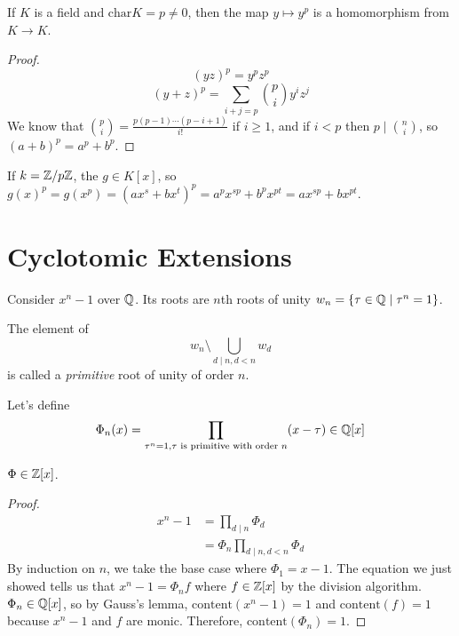 \documentclass[a4paper,twoside,master.tex]{subfiles}
\begin{document}
\begin{claim}
    If $ K $ is a field and $ \text{char} K = p \neq 0 $, then the map $ y \mapsto y^p $ is a homomorphism from $ K \to K $.
\end{claim}
\begin{proof}
    \begin{equation}
        (yz)^p = y^p z^p
    \end{equation}
    \begin{equation}
        (y+z)^p = \sum_{i+j=p} \binom{p}{i} y^i z^j
    \end{equation}
    We know that $ \binom{p}{i} = \frac{p(p-1)\cdots(p-i+1)}{i!} $ if $ i \geq 1 $, and if $ i<p $ then $ p\mid \binom{n}{i} $, so $ (a+b)^p = a^p + b^p $.
\end{proof}
\begin{corollary}
    If $ k = \mathbb{Z}/p\mathbb{Z} $, the $ g \in K[x] $, so $ g(x)^p = g(x^p) = (ax^s + bx^t)^p = a^p x^{sp} + b^p x^{pt} = ax^{sp} + bx^{pt} $.
\end{corollary}

\section{Cyclotomic Extensions}\label{sec:cyclotomic_extensions}

Consider $ x^n - 1 $ over $ \mathbb{Q} $. Its roots are $ n $th roots of unity $ w_n = \{\tau \in \mathbb{Q}\mid \tau^n = 1\} $.

\begin{definition}
    The element of
    \begin{equation}
        w_n \setminus \bigcup_{d\mid n, d<n} w_d 
    \end{equation}
    is called a \textit{primitive} root of unity of order $ n $.
\end{definition}

Let's define
\begin{equation}
    \Phi_n(x) = \prod_{\tau^n = 1, \tau \text{ is primitive with order } n} (x - \tau) \in \mathbb{Q}[x]
\end{equation}
\begin{claim}
    $ \Phi \in \mathbb{Z}[x] $.
\end{claim}
\begin{proof}
    \begin{align}
        x^n - 1 &= \prod_{d\mid n} \Phi_d\\
                &= \Phi_n \prod_{d\mid n, d<n} \Phi_d
    \end{align}
    By induction on $ n $, we take the base case where $ \Phi_1 = x-1 $. The equation we just showed tells us that $ x^n - 1 = \Phi_n f $ where $ f \in \mathbb{Z}[x] $ by the division algorithm. $ \Phi_n \in \mathbb{Q}[x] $, so by Gauss's lemma, $ \text{content}(x^n - 1) = 1 $ and $ \text{content}(f) = 1 $ because $ x^n - 1 $ and $ f $ are monic. Therefore, $ \text{content}(\Phi_n) = 1 $.
\end{proof}
\end{document}
